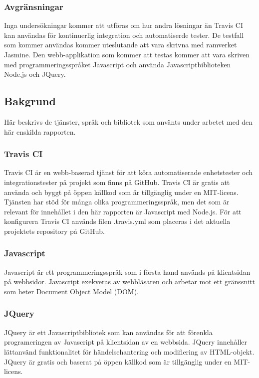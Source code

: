 \subsubsection{Avgränsningar}
Inga undersökningar kommer att utföras om hur andra lösningar än 
Travis CI kan användas för kontinuerlig 
integration och automatiserde tester. De testfall som kommer användas 
kommer uteslutande att vara skrivna med ramverket Jasmine. Den webb-applikation
som kommer att testas kommer att vara skriven med programmeringsspråket
Javascript och använda Javascriptbiblioteken Node.js och JQuery.

\subsection{Bakgrund}
Här beskrivs de tjänster, språk och bibliotek som använts under arbetet
med den här enskilda rapporten.

\subsubsection{Travis CI}
Travis CI är en webb-baserad tjänst för att köra automatiserade enhetstester och integrationstester
på projekt som finns på GitHub. Travis CI är gratis att använda och byggt på öppen källkod
som är tillgänglig under en MIT-licens. 
Tjänsten har stöd för många olika programmeringsspråk, men det som är 
relevant för innehållet i den här rapporten
är Javascript med Node.js. För att konfigurera Travis CI används filen .travis.yml 
som placeras i det aktuella
projektets repository på GitHub.

\subsubsection{Javascript}
Javascript är ett programmeringsspråk som i första hand används på klientsidan på webbsidor.
Javascript exekveras av webbläsaren och arbetar mot ett gränssnitt som heter 
Document Object Model (DOM).

\subsubsection{JQuery}
JQuery är ett Javascriptbibliotek som kan användas för att förenkla programeringen
av Javascript på klientsidan av en webbsida. JQuery innehåller lättanvänd
funktionalitet för händelsehantering och modifiering av HTML-objekt.
JQuery är gratis och baserat på öppen källkod som är tillgänglig under en
MIT-licens.


